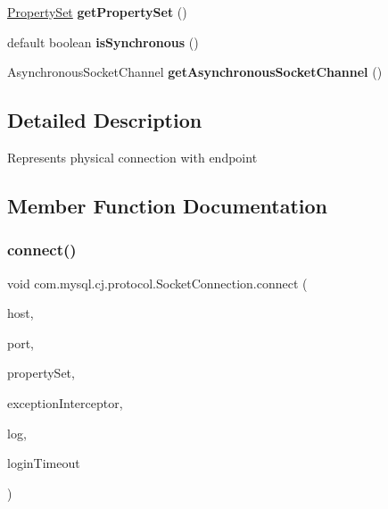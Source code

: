 \begin{DoxyCompactItemize}
\item 
\mbox{\label{interfacecom_1_1mysql_1_1cj_1_1protocol_1_1_socket_connection_a2adfa33e4b622f762a0b6c820621a8a7}} 
\mbox{\hyperlink{interfacecom_1_1mysql_1_1cj_1_1conf_1_1_property_set}{Property\+Set}} {\bfseries get\+Property\+Set} ()
\item 
\mbox{\label{interfacecom_1_1mysql_1_1cj_1_1protocol_1_1_socket_connection_a89c2521893554b7052f9e92cdd73c527}} 
default boolean {\bfseries is\+Synchronous} ()
\item 
\mbox{\label{interfacecom_1_1mysql_1_1cj_1_1protocol_1_1_socket_connection_acab5267ec9b4013b52015a1d9097066b}} 
Asynchronous\+Socket\+Channel {\bfseries get\+Asynchronous\+Socket\+Channel} ()
\end{DoxyCompactItemize}


\subsection{Detailed Description}
Represents physical connection with endpoint 

\subsection{Member Function Documentation}
\mbox{\label{interfacecom_1_1mysql_1_1cj_1_1protocol_1_1_socket_connection_ac20aea608e999684c82a0dbaaa5886c7}} 
\subsubsection{\texorpdfstring{connect()}{connect()}}
{\footnotesize\ttfamily void com.\+mysql.\+cj.\+protocol.\+Socket\+Connection.\+connect (\begin{DoxyParamCaption}\item[{String}]{host,  }\item[{int}]{port,  }\item[{\mbox{\hyperlink{interfacecom_1_1mysql_1_1cj_1_1conf_1_1_property_set}{Property\+Set}}}]{property\+Set,  }\item[{\mbox{\hyperlink{interfacecom_1_1mysql_1_1cj_1_1exceptions_1_1_exception_interceptor}{Exception\+Interceptor}}}]{exception\+Interceptor,  }\item[{\mbox{\hyperlink{interfacecom_1_1mysql_1_1cj_1_1log_1_1_log}{Log}}}]{log,  }\item[{int}]{login\+Timeout }\end{DoxyParamCaption})}

